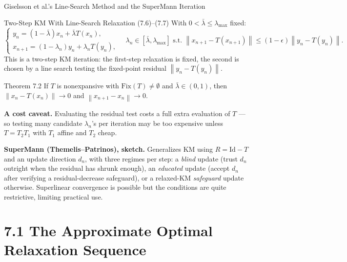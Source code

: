 \documentclass[aspectratio=169,10pt]{beamer}
\newcommand{\norm}[1]{\left\|#1\right\|}
\newcommand{\Fix}{\mathrm{Fix}}
\newcommand{\Id}{\mathrm{Id}}
\begin{document}
\begin{frame}{Giselsson et al.'s Line-Search Method and the SuperMann Iteration}

  \begin{block}{Two-Step KM With Line-Search Relaxation (7.6)--(7.7)}
    With $0<\bar\lambda\le\lambda_{\max}$ fixed:
    \[
      \begin{cases}
        y_n=(1-\bar\lambda)x_n+\bar\lambda T(x_n),\\
        x_{n+1}=(1-\lambda_n)y_n+\lambda_n T(y_n),
      \end{cases}
      \quad
      \lambda_n\in[\bar\lambda,\lambda_{\max}] \text{ s.t. }
      \norm{x_{n+1}-T(x_{n+1})}\le(1-\epsilon)\norm{y_n-T(y_n)}.
    \]
    This is a two-step KM iteration: the first-step relaxation is
    fixed, the second is chosen by a line search testing the
    fixed-point residual $\norm{y_n-T(y_n)}$.
  \end{block}

  \begin{alertblock}{Theorem 7.2}
    If $T$ is nonexpansive with $\Fix(T)\neq\emptyset$ and
    $\bar\lambda\in(0,1)$, then $\norm{x_n-T(x_n)}\to0$ and
    $\norm{x_{n+1}-x_n}\to0$.
  \end{alertblock}

  \textbf{A cost caveat.} Evaluating the residual test costs a full
  extra evaluation of $T$ --- so testing many candidate
  $\lambda_n$'s per iteration may be too expensive unless $T=T_2T_1$
  with $T_1$ affine and $T_2$ cheap.

  \textbf{SuperMann (Themelis--Patrinos), sketch.} Generalizes KM
  using $R=\Id-T$ and an update direction $d_n$, with three regimes
  per step: a \emph{blind} update (trust $d_n$ outright when the
  residual has shrunk enough), an \emph{educated} update (accept
  $d_n$ after verifying a residual-decrease safeguard), or a
  relaxed-KM \emph{safeguard} update otherwise. Superlinear
  convergence is possible but the conditions are quite restrictive,
  limiting practical use.

\end{frame}

\section{7.1 The Approximate Optimal Relaxation Sequence}
\end{document}
